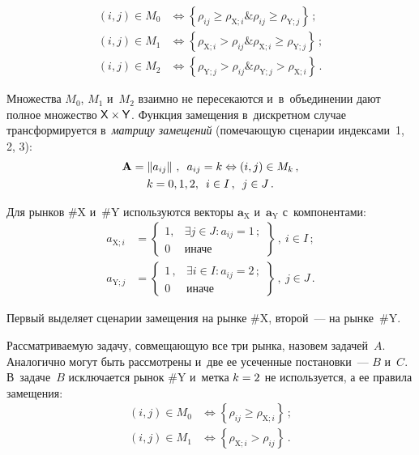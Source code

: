 \begin{multicols}{2}
\noindent
  \begin{align}
  (i,j)\in M_0 &\Leftrightarrow \left\{ \rho_{ij}\geq 
\rho_{\mathrm{X};i}\&\rho_{ij}\geq \rho_{\mathrm{Y};j}\right\}\,;\label{e3-ags}\\
  (i,j)\in M_1 &\Leftrightarrow \left\{ 
\rho_{\mathrm{X};i}>\rho_{ij}\&\rho_{\mathrm{X};i}\geq 
\rho_{\mathrm{Y};j}\right\}\,;\label{e4-ags}\\
  (i,j)\in M_2 &\Leftrightarrow  
\left\{ \rho_{\mathrm{Y};j}>\rho_{ij}\&\rho_{\mathrm{Y};j}> 
\rho_{\mathrm{X};i}\right\}\,.\label{e5-ags}
  \end{align}
  
  Множества $M_0$, $M_1$ и~$M_2$ взаимно не пересекаются 
и~в~объединении дают полное множество ${\sf X}\times {\sf Y}$. Функция 
замещения в~дискретном случае трансформируется в~\textit{матрицу 
замещений} (по\-ме\-ча\-ющую сценарии индексами~1, 2, 3):
  \begin{multline}
  \mathbf{A}=\left\| a_{ij}\right\|\,,\enskip a_{ij}=k\Leftrightarrow (i,j)\in M_k\,,\\
  k=0,1,2,\enskip i\in I\,,\enskip j\in J\,.
  \label{e6-ags}
  \end{multline}
  
  Для рынков \#X и~\#Y используются векторы $\boldsymbol{a}_{\mathrm{X}}$ 
и~$\boldsymbol{a}_{\mathrm{Y}}$ с~компонентами: 
  \begin{align}
  a_{\mathrm{X};i}&= \left.
  \begin{cases}
  1, & \exists j\in J: a_{ij}=1\,;\\
  0 & \mbox{иначе}
  \end{cases}\right\}\,,\ 
  i\in I\,;
  \label{e7-ags}
  \\
  a_{\mathrm{Y};j} &= \left.\begin{cases}
  1\,, & \exists i\in I: a_{ij}=2\,;\\
  0 & \mbox{иначе}
  \end{cases}\right\}\,,\
  j\in J\,.
  \label{e8-ags}
  \end{align}
  
  Первый выделяет сценарии замещения на рынке \#X, второй~--- на 
рынке~\#Y. 
  
  Рассматриваемую задачу, совмещающую все три рынка, назовем 
задачей~$A$. Аналогично могут быть рассмотрены и~две ее усеченные 
постановки~--- $B$ и~$C$. В~задаче~$B$ исключается рынок \#Y и~метка 
$k\hm = 2$ не используется, а ее правила замещения:
  \begin{align*}
  (i,j)\in M_0 &\Leftrightarrow \left\{ \rho_{ij}\geq \rho_{\mathrm{X};i}\right\}\,;\\
  (i,j)\in M_1 &\Leftrightarrow \left\{ \rho_{\mathrm{X};i}>\rho_{ij}\right\}\,.
  \end{align*}
  

\end{multicols}
